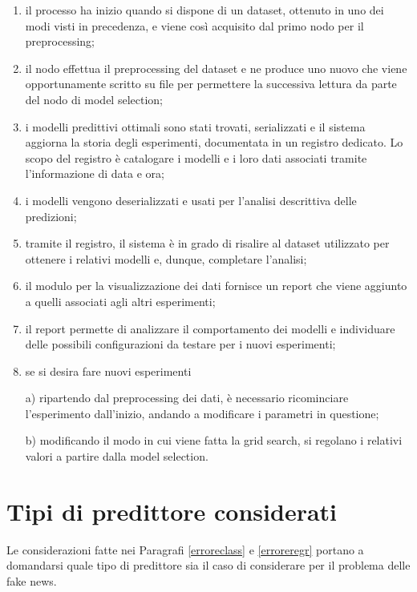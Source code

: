 \documentclass[12pt]{report}
\theoremstyle{definition}
\begin{document}
\begin{enumerate}
    \item il processo ha inizio quando si dispone di un dataset, ottenuto in uno dei modi visti in precedenza, e viene così acquisito dal primo nodo per il preprocessing;
    \item  il nodo effettua il preprocessing del dataset e ne produce uno nuovo che viene opportunamente scritto su file per permettere la successiva lettura da parte del nodo di model selection;
    \item i modelli predittivi ottimali sono stati trovati, serializzati e il sistema aggiorna la storia degli esperimenti, documentata in un registro dedicato. Lo scopo del registro è catalogare i modelli e i loro dati associati tramite l'informazione di data e ora;
    \item i modelli vengono deserializzati e usati per l'analisi descrittiva delle predizioni;
    \item tramite il registro, il sistema è in grado di risalire al dataset utilizzato per ottenere i relativi modelli e, dunque, completare l'analisi;
    \item il modulo per la visualizzazione dei dati fornisce un report che viene aggiunto a quelli associati agli altri esperimenti;
    \item il report permette di analizzare il comportamento dei modelli e individuare delle possibili configurazioni da testare per i nuovi esperimenti;
    \item se si desira fare nuovi esperimenti
    
    a) ripartendo dal preprocessing dei dati, è necessario ricominciare l'esperimento dall'inizio, andando a modificare i parametri in questione;
    
    b) modificando il modo in cui viene fatta la grid search, si regolano i relativi valori a partire dalla model selection.
\end{enumerate}

\section{Tipi di predittore considerati}\label{predictors}
Le considerazioni fatte nei Paragrafi \ref{erroreclass} e \ref{erroreregr} portano a domandarsi quale tipo di predittore sia il caso di considerare per il problema delle fake news.
\end{document}
